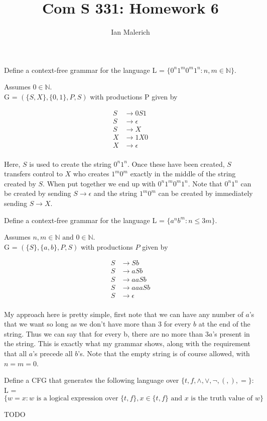 \documentclass[12pt]{jhwhw}
\author{Ian Malerich}
\title{Com S 331: Homework 6}
\begin{document}
\raggedright

\problem{}

	Define a context-free grammar for the language L = $\{0^n1^m0^m1^n: n,m\in \mathbb{N}\}$.

\solution

	Assumes $0\in \mathbb{N}$. \\
	G = $(\{S, X\}, \{0,1\}, P, S)$ with productions P given by

	\begin{align*}
		S &\rightarrow 0S1 \\
		S &\rightarrow \epsilon  \\
		S &\rightarrow X \\
		X &\rightarrow 1X0 \\
		X &\rightarrow \epsilon \\
	\end{align*}

	Here, $S$ is used to create the string $0^n1^n$. Once these have been created,
	$S$ transfers control to $X$ who creates $1^m0^m$ exactly in the middle of the
	string created by $S$. When put together we end up with $0^n1^m0^m1^n$.
	Note that $0^n1^n$ can be created by sending $S\rightarrow\epsilon$ and the string
	$1^m0^m$ can be created by immediately sending $S\rightarrow X$.

\problem{}

	Define a context-free grammar for the language L = $\{a^nb^m: n\leq 3m\}$.

\solution

	Assumes $n,m\in \mathbb{N} \text{ and } 0\in \mathbb{N}$.  \\
	G = $(\{S\}, \{a,b\}, P, S)$ with productions $P$ given by

	\begin{align*}
		S &\rightarrow Sb \\
		S &\rightarrow aSb \\
		S &\rightarrow aaSb\\
		S &\rightarrow aaaSb\\
		S &\rightarrow \epsilon \\
	\end{align*}

	My approach here is pretty simple, first note that we can have any number of $a$'s that 
	we want so long as we don't have more than 3 for every $b$ at the end of the string.
	Thus we can say that for every b, there are no more than 3$a$'s present in the string.
	This is exactly what my grammar shows, along with the requirement that all $a$'s precede
	all $b$'s. Note that the empty string is of course allowed,
	with $n=m=0$.

\problem{}

	Define a CFG that generates the following language over $\{t,f,\wedge,\vee,\neg,(,),=\}$: \\
	L = $\{w=x : w \text{ is a logical expression over } \{t,f\}, x\in \{t,f\}
	\text{ and } x \text{ is the truth value of } w\}$

\solution

	TODO
\end{document}
